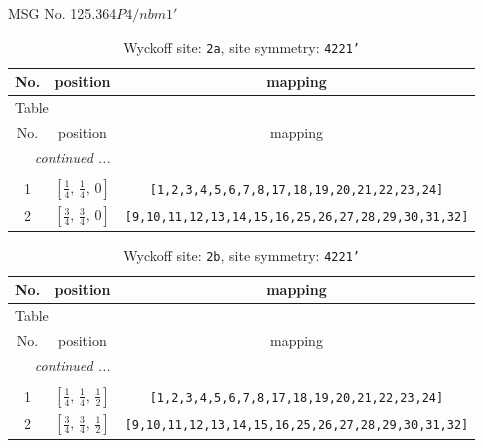\documentclass[fleqn,8pt]{jsarticle}
\begin{document}
\setcounter{MaxMatrixCols}{32}

\renewcommand{\tablename}{Table~}
\renewcommand{\figurename}{Figure~}
\begin{center}
\LARGE
MSG No. 125.364\quad$P4/nbm1'$
\end{center}
\renewcommand{\arraystretch}{1.2}
\begin{longtable}{ccc}
\caption{Wyckoff site: {\tt 2a}, site symmetry: {\tt 4221'}}
 \\
 \hline \hline
No. & position & mapping \\ \hline \endfirsthead

\multicolumn{2}{l}{\tablename\ \thetable{}} \\
 \hline \hline
No. & position & mapping \\ \hline \endhead

 \hline \hline
\multicolumn{2}{r}{\footnotesize\it continued ...} \\ \endfoot

 \hline \hline
\multicolumn{2}{r}{} \\ \endlastfoot

1 & $\left[ \frac{1}{4},\, \frac{1}{4},\, 0 \right]$ & {\tt [1,2,3,4,5,6,7,8,17,18,19,20,21,22,23,24]} \\ \hline
2 & $\left[ \frac{3}{4},\, \frac{3}{4},\, 0 \right]$ & {\tt [9,10,11,12,13,14,15,16,25,26,27,28,29,30,31,32]} \\
\end{longtable}
\renewcommand{\arraystretch}{1.2}
\begin{longtable}{ccc}
\caption{Wyckoff site: {\tt 2b}, site symmetry: {\tt 4221'}}
 \\
 \hline \hline
No. & position & mapping \\ \hline \endfirsthead

\multicolumn{2}{l}{\tablename\ \thetable{}} \\
 \hline \hline
No. & position & mapping \\ \hline \endhead

 \hline \hline
\multicolumn{2}{r}{\footnotesize\it continued ...} \\ \endfoot

 \hline \hline
\multicolumn{2}{r}{} \\ \endlastfoot

1 & $\left[ \frac{1}{4},\, \frac{1}{4},\, \frac{1}{2} \right]$ & {\tt [1,2,3,4,5,6,7,8,17,18,19,20,21,22,23,24]} \\ \hline
2 & $\left[ \frac{3}{4},\, \frac{3}{4},\, \frac{1}{2} \right]$ & {\tt [9,10,11,12,13,14,15,16,25,26,27,28,29,30,31,32]} \\
\end{longtable}
\end{document}
